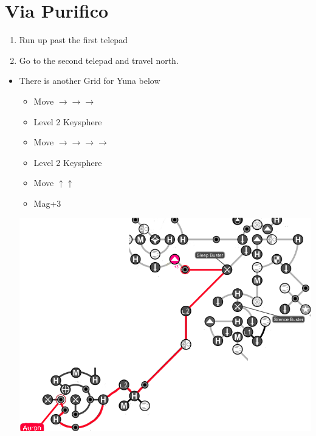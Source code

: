 \chapter{Via Purifico}

\begin{enumerate}
	\item Run up past the first telepad
	\item Go to the second telepad and travel north.
\end{enumerate}
\begin{spheregrid}
	\begin{itemize}
		\item There is another Grid for Yuna below
		\auronf
		\begin{itemize}
			\item Move $\rightarrow\rightarrow\rightarrow$
			\item Level 2 Keysphere
			\item Move $\rightarrow\rightarrow\rightarrow\rightarrow$
			\item Level 2 Keysphere
			\item Move $\uparrow\uparrow$
			\item Mag+3
		\end{itemize}
		\includegraphics[width=.7\columnwidth]{graphics/Auron_Via_Purifico}
	\end{itemize}
\end{spheregrid}
